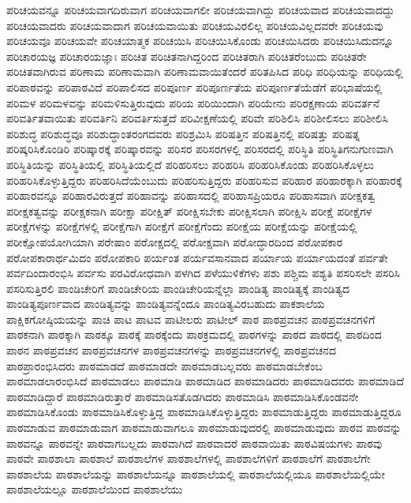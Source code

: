 {ಪರಿಚಯವನ್ನೂ
ಪರಿಚಯವಾಗದಿರುವಾಗ
ಪರಿಚಯವಾಗಲೀ
ಪರಿಚಯವಾಗಿದ್ದು
ಪರಿಚಯವಾದ
ಪರಿಚಯವಾದದ್ದು
ಪರಿಚಯವಾದರು
ಪರಿಚಯವಾದಾಗ
ಪರಿಚಯವಾಯಿತು
ಪರಿಚಯವಿರಲಿಲ್ಲ
ಪರಿಚಯವಿಲ್ಲದವರೇ
ಪರಿಚಯವು
ಪರಿಚಯವೂ
ಪರಿಚಯವೇ
ಪರಿಚಯಾತ್ಮಕ
ಪರಿಚಯಿಸಿ
ಪರಿಚಯಿಸಿಕೊಂಡು
ಪರಿಚಯಿಸಿದರು
ಪರಿಚಯಿಸಿದುದನ್ನೂ
ಪರಿಚಾರಯಜ್ಞ
ಪರಿಚಾರಯಜ್ಞಾಃ
ಪರಿಚಿತ
ಪರಿಚಿತನಾಗಿದ್ದರಿಂದ
ಪರಿಚಿತರಾಗಿ
ಪರಿಚಿತರೆಂಬುದು
ಪರಿಚಿತರೇ
ಪರಿಚಿತವಾಗಿರುವ
ಪರಿಣಾಮ
ಪರಿಣಾಮವಾಗಿ
ಪರಿಣಾಮವಾಯಿತೆಂದರೆ
ಪರಿತಪಿಸಿದ
ಪರಿಧಿ
ಪರಿಧಿಯನ್ನು
ಪರಿಧಿಯಲ್ಲಿ
ಪರಿಪಾಠವನ್ನು
ಪರಿಪಾಠವಿದೆ
ಪರಿಪಾಲಿಸದ
ಪರಿಪೂರ್ಣ
ಪರಿಪೂರ್ಣತೆಯ
ಪರಿಪೂರ್ಣತೆಯೆಡೆಗೆ
ಪರಿಭಾಷೆಯಲ್ಲಿ
ಪರಿಮಳ
ಪರಿಮಳವನ್ನು
ಪರಿಮಳಿಸುತ್ತಿರುವುದು
ಪರಿಯ
ಪರಿಯಿಂದಾಗಿ
ಪರಿಯೇನು
ಪರಿರಕ್ಷಣಾಯ
ಪರಿವರ್ತನೆ
ಪರಿವರ್ತಿತವಾಯಿತು
ಪರಿವರ್ತಿನಿ
ಪರಿವರ್ತಿಸುತ್ತದೆ
ಪರಿವೀಕ್ಷಣೆಯಲ್ಲಿ
ಪರಿವೇ
ಪರಿಶಿಲಿಸಿ
ಪರಿಶೀಲಿಸಲು
ಪರಿಶೀಲಿಸಿ
ಪರಿಶುದ್ಧ
ಪರಿಶುದ್ಧವೂ
ಪರಿಶುದ್ಧಾಂತರಂಗದವರು
ಪರಿಶ್ರಮಿಸಿ
ಪರಿಷತ್ತಿನ
ಪರಿಷತ್ತಿನಲ್ಲಿ
ಪರಿಷತ್ತು
ಪರಿಷತ್ನ
ಪರಿಷ್ಕರಿಸಿಕೊಂಡಿರಿ
ಪರಿಷ್ಕಾರಕ್ಕೆ
ಪರಿಷ್ಕಾರವನ್ನು
ಪರಿಸರ
ಪರಿಸರಗಳಲ್ಲಿ
ಪರಿಸರದಲ್ಲಿ
ಪರಿಸ್ಥಿತಿ
ಪರಿಸ್ಥಿತಿಗನುಗುಣವಾಗಿ
ಪರಿಸ್ಥಿತಿಯನ್ನು
ಪರಿಸ್ಥಿತಿಯಲ್ಲಿ
ಪರಿಸ್ಥಿತಿಯಲ್ಲಿದೆ
ಪರಿಹರಿಸಲು
ಪರಿಹರಿಸಿ
ಪರಿಹರಿಸಿಕೊಂಡು
ಪರಿಹರಿಸಿಕೊಳ್ಳಲು
ಪರಿಹರಿಸಿಕೊಳ್ಳುತ್ತಿದ್ದರು
ಪರಿಹರಿಸಿದೆಯೆಂಬುದು
ಪರಿಹರಿಸುತ್ತಿದ್ದರು
ಪರಿಹರಿಸುವ
ಪರಿಹಾರ
ಪರಿಹಾರಕ್ಕಾಗಿ
ಪರಿಹಾರಕ್ಕೆ
ಪರಿಹಾರವನ್ನೂ
ಪರಿಹಾರವಿರುತ್ತದೆ
ಪರಿಹಾವನ್ನು
ಪರಿಹಾಸದಲ್ಲಿ
ಪರಿಹಾಸಪ್ರಿಯರೂ
ಪರಿಹಾಸವಾಗಿ
ಪರೀಕ್ಷಕತ್ವ
ಪರೀಕ್ಷಕತ್ವವನ್ನು
ಪರೀಕ್ಷಕನಾಗಿ
ಪರೀಕ್ಷಾ
ಪರೀಕ್ಷಿತ್
ಪರೀಕ್ಷಿಸಬೇಕು
ಪರೀಕ್ಷಿಸಲಾಗಿ
ಪರೀಕ್ಷಿಸಿ
ಪರೀಕ್ಷೆ
ಪರೀಕ್ಷೆಗಳ
ಪರೀಕ್ಷೆಗಳನ್ನು
ಪರೀಕ್ಷೆಗಳಲ್ಲಿ
ಪರೀಕ್ಷೆಗಾಗಿ
ಪರೀಕ್ಷೆಗೆ
ಪರೀಕ್ಷೆಗೆಂದು
ಪರೀಕ್ಷೆಯ
ಪರೀಕ್ಷೆಯನ್ನು
ಪರೀಕ್ಷೆಯಲ್ಲಿ
ಪರೀಕ್ಷೋಪಯೋಗಿಯಾಗಿ
ಪರೇಷಾಂ
ಪರೋಕ್ಷದಲ್ಲಿ
ಪರೋಕ್ಷವಾಗಿ
ಪರೋದ್ಧಾರದಿಂದ
ಪರೋಪಕಾರ
ಪರೋಪಕಾರಾರ್ಥಮಿದಂ
ಪರೋಪಕಾರಿ
ಪರ್ಯಂತ
ಪರ್ಯವಸಾನವಾದ
ಪರ್ಯಾಯ
ಪರ್ಯಾಯದಂತೆ
ಪರ್ವತೇ
ಪರ್ವದಿಂದಾರಂಭಿಸಿ
ಪರ್ವಸು
ಪರವಿರೋಧವಾಗಿ
ಪಳಗಿದ
ಪಳೆಯುಳಿಕೆಗಳು
ಪಶು
ಪಶ್ಚಿಮ
ಪಶ್ಯತಿ
ಪಸರಿಸಲೇ
ಪಸರಿಸಿ
ಪಸರಿಸುತ್ತಿರಲಿ
ಪಾಂಡಿಚೇರಿಗೆ
ಪಾಂಡಿಚೇರಿಯ
ಪಾಂಡಿಚೇರಿಯನ್ನೆಲ್ಲಾ
ಪಾಂಡಿತ್ಯ
ಪಾಂಡಿತ್ಯಕ್ಕೆ
ಪಾಂಡಿತ್ಯದ
ಪಾಂಡಿತ್ಯಪೂರ್ಣವಾದ
ಪಾಂಡಿತ್ಯವನ್ನು
ಪಾಂಡಿತ್ಯವನ್ನೆಂದೂ
ಪಾಂಡಿತ್ಯವಿರಬಹುದು
ಪಾಕಶಾಲೆಯ
ಪಾಕ್ಷಿಕಗೋಷ್ಠಿಯಯನ್ನು
ಪಾಚಿ
ಪಾಟ
ಪಾಟವ
ಪಾಟೀಲರು
ಪಾಟೀಲ್
ಪಾಠ
ಪಾಠಪ್ರವಚನ
ಪಾಠಪ್ರವಚನಗಳಿಗೆ
ಪಾಠಕನಾಗಿ
ಪಾಠಕ್ಕಾಗಿ
ಪಾಠಕ್ಕೂ
ಪಾಠಕ್ಕೆ
ಪಾಠಕ್ಕೆಂದು
ಪಾಠಕ್ರಮದಲ್ಲಿ
ಪಾಠಗಳನ್ನು
ಪಾಠದ
ಪಾಠದಲ್ಲಿ
ಪಾಠದಿಂದ
ಪಾಠನ
ಪಾಠಪ್ರವಚನ
ಪಾಠಪ್ರವಚನಗಳ
ಪಾಠಪ್ರವಚನಗಳನ್ನು
ಪಾಠಪ್ರವಚನಗಳಲ್ಲಿ
ಪಾಠಪ್ರವಚನದ
ಪಾಠಪ್ರಾರಂಭಿಸಿದರು
ಪಾಠಮಾಡದೆ
ಪಾಠಮಾಡದೇ
ಪಾಠಮಾಡಬಲ್ಲವರು
ಪಾಠಮಾಡಬೇಕೆಂಬ
ಪಾಠಮಾಡಲಾರಂಭಿಸಿದೆ
ಪಾಠಮಾಡಲು
ಪಾಠಮಾಡಿ
ಪಾಠಮಾಡಿದ
ಪಾಠಮಾಡಿದರು
ಪಾಠಮಾಡಿದವರು
ಪಾಠಮಾಡಿದೆ
ಪಾಠಮಾಡಿದ್ದಾರೆ
ಪಾಠಮಾಡಿರುತ್ತಾರೆ
ಪಾಠಮಾಡಿಸತೊಡಗಿದರು
ಪಾಠಮಾಡಿಸಿ
ಪಾಠಮಾಡಿಸಿಕೊಂಡವನೇ
ಪಾಠಮಾಡಿಸಿಕೊಂಡು
ಪಾಠಮಾಡಿಸಿಕೊಳ್ಳುತ್ತಿದ್ದ
ಪಾಠಮಾಡಿಸಿಕೊಳ್ಳುತ್ತಿದ್ದರು
ಪಾಠಮಾಡುತ್ತಿದ್ದರು
ಪಾಠಮಾಡುತ್ತಿದ್ದರೂ
ಪಾಠಮಾಡುವ
ಪಾಠಮಾಡುವಾಗ
ಪಾಠಮಾಡುವಾಗಲೂ
ಪಾಠಮಾಡುವುದರಲ್ಲಿ
ಪಾಠಮಾಡುವುದು
ಪಾಠವ
ಪಾಠವನ್ನು
ಪಾಠವನ್ನೂ
ಪಾಠವನ್ನೇ
ಪಾಠವಾಗಬಲ್ಲದು
ಪಾಠವಾಗಿದೆ
ಪಾಠವಾದರೆ
ಪಾಠವಾಯಿತು
ಪಾಠವಿಷಯಗಳು
ಪಾಠವು
ಪಾಠವೇ
ಪಾಠಶಾಲಾ
ಪಾಠಶಾಲೆ
ಪಾಠಶಾಲೆಗಳ
ಪಾಠಶಾಲೆಗಳಲ್ಲಿ
ಪಾಠಶಾಲೆಗಳಿಗೆ
ಪಾಠಶಾಲೆಗೆ
ಪಾಠಶಾಲೆಗೇ
ಪಾಠಶಾಲೆಯ
ಪಾಠಶಾಲೆಯನ್ನು
ಪಾಠಶಾಲೆಯನ್ನೂ
ಪಾಠಶಾಲೆಯಲ್ಲಿ
ಪಾಠಶಾಲೆಯಲ್ಲಿಯೂ
ಪಾಠಶಾಲೆಯಲ್ಲಿಯೇ
ಪಾಠಶಾಲೆಯಲ್ಲೂ
ಪಾಠಶಾಲೆಯಿಂದ
ಪಾಠಶಾಲೆಯು
}

